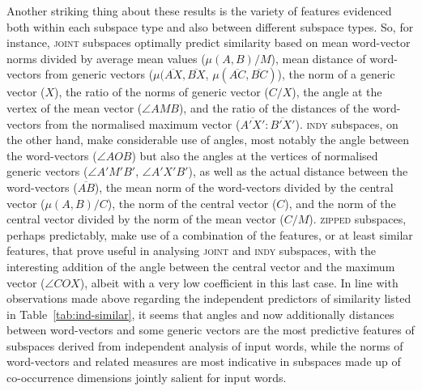 Another striking thing about these results is the variety of features evidenced both within each subspace type and also between different subspace types.  So, for instance, \textsc{joint} subspaces optimally predict similarity based on mean word-vector norms divided by average mean values ($\mu(A,B)/M$), mean distance of word-vectors from generic vectors ($\mu(\overline{AX},\overline{BX}$, $\mu(\overline{AC},\overline{BC})$), the norm of a generic vector ($X$), the ratio of the norms of generic vector ($C/X$), the angle at the vertex of the mean vector ($\angle AMB$), and the ratio of the distances of the word-vectors from the normalised maximum vector ($\overline{A'X'}:\overline{B'X'}$).  \textsc{indy} subspaces, on the other hand, make considerable use of angles, most notably the angle between the word-vectors ($\angle AOB$) but also the angles at the vertices of normalised generic vectors ($\angle A'M'B'$, $\angle A'X'B'$), as well as the actual distance between the word-vectors ($\overline{AB}$), the mean norm of the word-vectors divided by the central vector ($\mu (A,B)/C$), the norm of the central vector ($C$), and the norm of the central vector divided by the norm of the mean vector ($C/M$).  \textsc{zipped} subspaces, perhaps predictably, make use of a combination of the features, or at least similar features, that prove useful in analysing \textsc{joint} and \textsc{indy} subspaces, with the interesting addition of the angle between the central vector and the maximum vector ($\angle COX$), albeit with a very low coefficient in this last case.  In line with observations made above regarding the independent predictors of similarity listed in Table~\ref{tab:ind-similar}, it seems that angles and now additionally distances between word-vectors and some generic vectors are the most predictive features of subspaces derived from independent analysis of input words, while the norms of word-vectors and related measures are most indicative in subspaces made up of co-occurrence dimensions jointly salient for input words.

